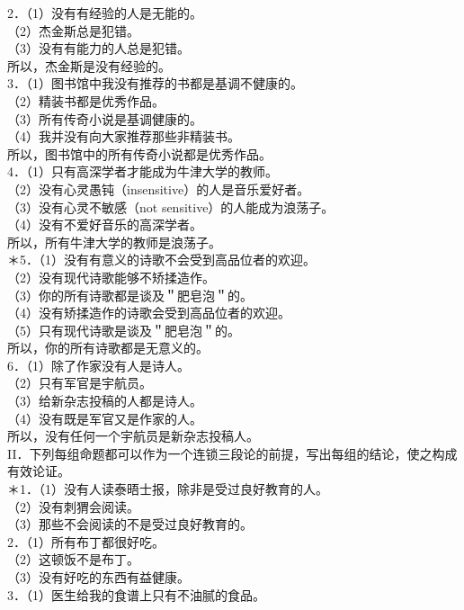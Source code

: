 2．（1）没有有经验的人是无能的。\\
（2）杰金斯总是犯错。\\
（3）没有有能力的人总是犯错。\\
所以，杰金斯是没有经验的。\\
3．（1）图书馆中我没有推荐的书都是基调不健康的。\\
（2）精装书都是优秀作品。\\
（3）所有传奇小说是基调健康的。\\
（4）我并没有向大家推荐那些非精装书。\\
所以，图书馆中的所有传奇小说都是优秀作品。\\
4．（1）只有高深学者才能成为牛津大学的教师。\\
（2）没有心灵愚钝（insensitive）的人是音乐爱好者。\\
（3）没有心灵不敏感（not sensitive）的人能成为浪荡子。\\
（4）没有不爱好音乐的高深学者。\\
所以，所有牛津大学的教师是浪荡子。\\
＊5．（1）没有有意义的诗歌不会受到高品位者的欢迎。\\
（2）没有现代诗歌能够不矫揉造作。\\
（3）你的所有诗歌都是谈及＂肥皂泡＂的。\\
（4）没有矫揉造作的诗歌会受到高品位者的欢迎。\\
（5）只有现代诗歌是谈及＂肥皂泡＂的。\\
所以，你的所有诗歌都是无意义的。\\
6．（1）除了作家没有人是诗人。\\
（2）只有军官是宇航员。\\
（3）给新杂志投稿的人都是诗人。\\
（4）没有既是军官又是作家的人。\\
所以，没有任何一个宇航员是新杂志投稿人。\\
II．下列每组命题都可以作为一个连锁三段论的前提，写出每组的结论，使之构成有效论证。\\
＊1．（1）没有人读泰晤士报，除非是受过良好教育的人。\\
（2）没有刺猬会阅读。\\
（3）那些不会阅读的不是受过良好教育的。\\
2．（1）所有布丁都很好吃。\\
（2）这顿饭不是布丁。\\
（3）没有好吃的东西有益健康。\\
3．（1）医生给我的食谱上只有不油腻的食品。\\
